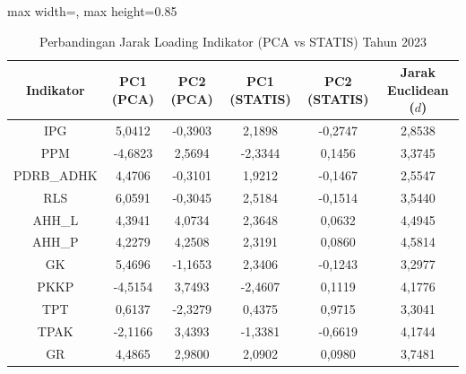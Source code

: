 \begin{table}[H]
\centering
\caption{Perbandingan Jarak Loading Indikator (PCA vs STATIS) Tahun 2023} \label{tab:app2jarak_loading_2023}
\begin{adjustbox}{max width=\textwidth, max height=0.85\textheight}
\begin{tabular}{|c|c|c|c|c|c|}
\hline
\textbf{Indikator} & \textbf{PC1 (PCA)} & \textbf{PC2 (PCA)} & \textbf{PC1 (STATIS)} & \textbf{PC2 (STATIS)} & \textbf{Jarak Euclidean ($d$)} \\
\hline
IPG & 5,0412 & -0,3903 & 2,1898 & -0,2747 & 2,8538 \\
PPM & -4,6823 & 2,5694 & -2,3344 & 0,1456 & 3,3745 \\
PDRB\_ADHK & 4,4706 & -0,3101 & 1,9212 & -0,1467 & 2,5547 \\
RLS & 6,0591 & -0,3045 & 2,5184 & -0,1514 & 3,5440 \\
AHH\_L & 4,3941 & 4,0734 & 2,3648 & 0,0632 & 4,4945 \\
AHH\_P & 4,2279 & 4,2508 & 2,3191 & 0,0860 & 4,5814 \\
GK & 5,4696 & -1,1653 & 2,3406 & -0,1243 & 3,2977 \\
PKKP & -4,5154 & 3,7493 & -2,4607 & 0,1119 & 4,1776 \\
TPT & 0,6137 & -2,3279 & 0,4375 & 0,9715 & 3,3041 \\
TPAK & -2,1166 & 3,4393 & -1,3381 & -0,6619 & 4,1744 \\
GR & 4,4865 & 2,9800 & 2,0902 & 0,0980 & 3,7481 \\
\hline
\end{tabular}
\end{adjustbox}
\end{table}